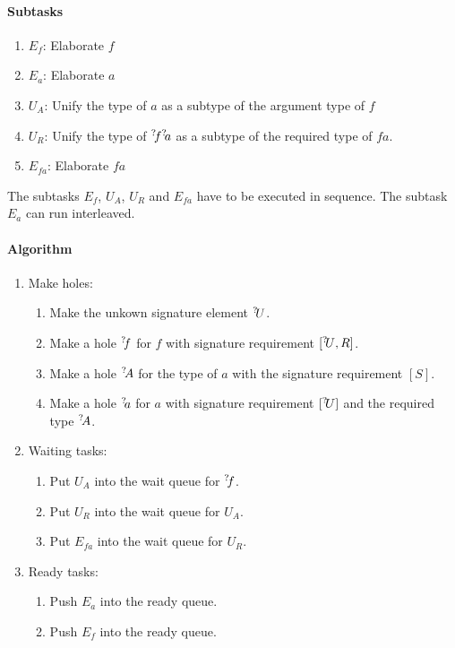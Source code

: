 \paragraph{Subtasks}
\begin{enumerate}
    \item $E_f$: Elaborate $f$
    \item $E_a$: Elaborate $a$
    \item $U_{A}$: Unify the type of $a$ as a subtype of the argument type of
        $f$
    \item $U_{R}$: Unify the type of ${{}^? \kern-0.2em f} {{}^? \kern-0.2em a}$ as a subtype of the
        required type of $fa$.
    \item $E_{fa}$: Elaborate $fa$
\end{enumerate}

The subtasks $E_f$, $U_A$, $U_R$ and $E_{fa}$ have to be executed in sequence. The
subtask $E_a$ can run interleaved.


\paragraph{Algorithm}
\begin{enumerate}
    \item Make holes:
        \begin{enumerate}
            \item Make the unkown signature element ${{}^? \kern-0.2em U}$.

            \item Make a hole ${{}^? \kern-0.2em f}$ for $f$ with signature requirement $[{{}^? \kern-0.2em U}, R]$.

            \item Make a hole ${{}^? \kern-0.2em A}$ for the type of $a$ with the signature
                requirement $[S]$.

            \item Make a hole ${{}^? \kern-0.2em a}$ for $a$ with signature requirement $[{{}^? \kern-0.2em U}]$
                and the
                required type ${{}^? \kern-0.2em A}$.
        \end{enumerate}

    \item Waiting tasks:
        \begin{enumerate}
            \item Put $U_{A}$ into the wait queue for ${{}^? \kern-0.2em f}$.

            \item Put $U_R$ into the wait queue for $U_A$.

            \item Put $E_{fa}$ into the wait queue for $U_R$.
        \end{enumerate}

    \item Ready tasks:
        \begin{enumerate}
            \item Push $E_a$ into the ready queue.

            \item Push $E_f$ into the ready queue.
        \end{enumerate}
\end{enumerate}


